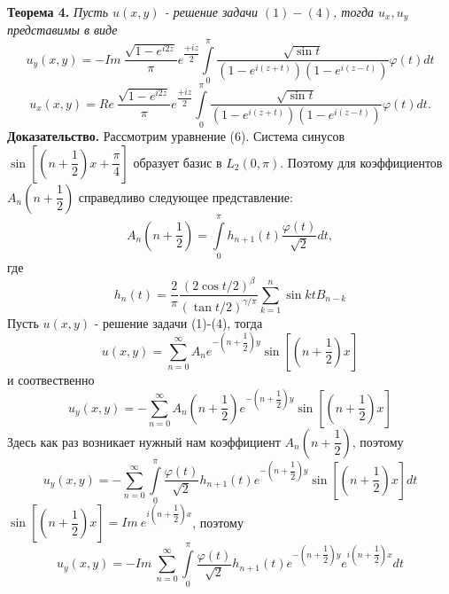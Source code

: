 \documentclass[9pt]{article}
\begin{document}
	\textbf{Теорема 4.} \textit{
		Пусть $u(x,y)$ - решение задачи $(1)-(4)$, тогда $u_x, u_y$ представимы в виде
		\begin{equation}
			u_y(x,y) = - Im\  \dfrac{ \sqrt{1 - e^{i2z}} }{\pi} e^{\dfrac{+iz}{2}} \int\limits_0^\pi  \dfrac{\sqrt{\sin{t}}}{\left(1 - e^{i(z+t)} \right) \left(1 - e^{i(z-t)}\right)}  \varphi(t) dt
		\end{equation}
		\begin{equation}
			u_x(x,y) = Re\   \dfrac{ \sqrt{1 - e^{i2z}} }{\pi} e^{\dfrac{+iz}{2}} \int\limits_0^\pi  \dfrac{\sqrt{\sin{t}}}{\left(1 - e^{i(z+t)} \right) \left(1 - e^{i(z-t)}\right)}  \varphi(t) dt.
		\end{equation}}
	\textbf{Доказательство. }
		\newline
		Рассмотрим уравнение (6). Система синусов $\sin{\left[\left(n +\dfrac12\right)x + \dfrac\pi4\right]}$ образует базис в $L_2(0,\pi)$. Поэтому для коэффициентов $A_n\left(n+\dfrac12\right)$ справедливо следующее представление:
		\begin{equation*}
			A_n\left(n+\dfrac12\right) = \int\limits_0^\pi h_{n+1}(t) \dfrac{\varphi(t)}{\sqrt2} dt, 
		\end{equation*}
		где
		\begin{equation*}
			h_n(t) = \dfrac{2}{\pi}\dfrac{(2\cos{t/2})^\beta}{(\tan{t/2})^{\gamma/\pi}} \sum\limits_{k=1}^n \sin{kt} B_{n-k}
		\end{equation*}
		Пусть $u(x,y)$ - решение задачи (1)-(4), тогда
		\begin{equation*}
			u(x,y) = \sum\limits_{n=0}^{\infty} A_n e^{-\left(n + \dfrac12\right)y} \sin{\left[\left(n + \dfrac12\right)x\right]}
		\end{equation*}
		и соотвественно
		\begin{equation*}
			u_y(x,y) = -\sum\limits_{n=0}^{\infty} A_n \left(n +\dfrac12\right) e^{-\left(n + \dfrac12\right)y} \sin{\left[\left(n + \dfrac12\right)x\right]}
		\end{equation*}
		Здесь как раз возникает нужный нам коэффициент $A_n \left(n+\dfrac12\right)$, поэтому
		\begin{equation*}
			u_y(x,y)  = - \sum\limits_{n=0}^{\infty}  \int\limits_0^\pi \dfrac{\varphi(t)}{\sqrt2}  h_{n+1}(t)  e^{-\left(n + \dfrac12\right)y} \sin{\left[\left(n + \dfrac12\right)x\right]} dt
		\end{equation*}
		$\sin{\left[\left(n + \dfrac12\right)x\right]} = Im \ e^{i\left(n + \dfrac12\right)x}$, поэтому
		\begin{equation*}
			u_y(x,y)  = -  Im \ \sum\limits_{n=0}^{\infty}  \int\limits_0^\pi \dfrac{\varphi(t)}{\sqrt2}  h_{n+1}(t)  e^{-\left(n + \dfrac12\right)y} e^{i\left(n + \dfrac12\right)x} dt
		\end{equation*}
\end{document}
